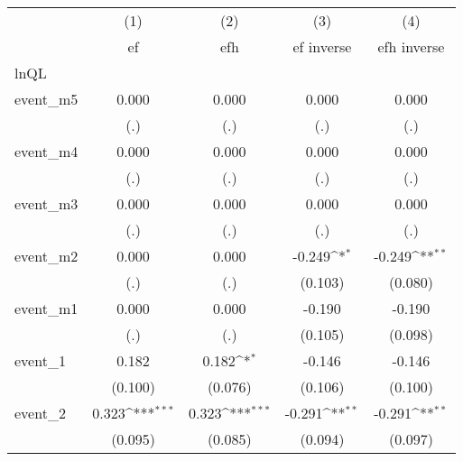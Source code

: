 {
\def\sym#1{\ifmmode^{#1}\else\(^{#1}\)\fi}
\begin{tabular}{l*{4}{c}}
\hline\hline
            &\multicolumn{1}{c}{(1)}&\multicolumn{1}{c}{(2)}&\multicolumn{1}{c}{(3)}&\multicolumn{1}{c}{(4)}\\
            &\multicolumn{1}{c}{ef}&\multicolumn{1}{c}{efh}&\multicolumn{1}{c}{ef inverse}&\multicolumn{1}{c}{efh inverse}\\
\hline
lnQL        &                     &                     &                     &                     \\
event\_m5    &       0.000         &       0.000         &       0.000         &       0.000         \\
            &         (.)         &         (.)         &         (.)         &         (.)         \\
[1em]
event\_m4    &       0.000         &       0.000         &       0.000         &       0.000         \\
            &         (.)         &         (.)         &         (.)         &         (.)         \\
[1em]
event\_m3    &       0.000         &       0.000         &       0.000         &       0.000         \\
            &         (.)         &         (.)         &         (.)         &         (.)         \\
[1em]
event\_m2    &       0.000         &       0.000         &      -0.249\sym{*}  &      -0.249\sym{**} \\
            &         (.)         &         (.)         &     (0.103)         &     (0.080)         \\
[1em]
event\_m1    &       0.000         &       0.000         &      -0.190         &      -0.190         \\
            &         (.)         &         (.)         &     (0.105)         &     (0.098)         \\
[1em]
event\_1     &       0.182         &       0.182\sym{*}  &      -0.146         &      -0.146         \\
            &     (0.100)         &     (0.076)         &     (0.106)         &     (0.100)         \\
[1em]
event\_2     &       0.323\sym{***}&       0.323\sym{***}&      -0.291\sym{**} &      -0.291\sym{**} \\
            &     (0.095)         &     (0.085)         &     (0.094)         &     (0.097)         \\

\end{tabular}}
